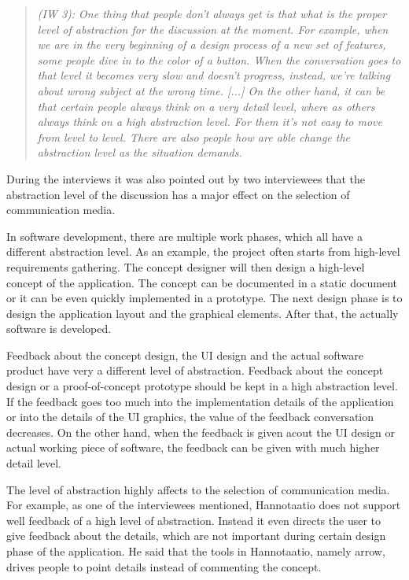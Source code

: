 \documentclass[english,12pt,a4paper,pdftex]{article}
\newcommand{\q}[2]{
\begin{quote}
\emph{(IW #1): #2}
\end{quote}}
\begin{document}
\q{3}{One thing that people don't always get is that what is the proper level of abstraction for the discussion at the moment. For example, when we are in the very beginning of a design process of a new set of features, some people dive in to the color of a button. When the conversation goes to that level it becomes very slow and doesn't progress, instead, we're talking about wrong subject at the wrong time. [...] On the other hand, it can be that certain people always think on a very detail level, where as others always think on a high abstraction level. For them it's not easy to move from level to level. There are also people how are able change the abstraction level as the situation demands.}

During the interviews it was also pointed out by two interviewees that the abstraction level of the discussion has a major effect on the selection of communication media.

In software development, there are multiple work phases, which all have a different abstraction level. As an example, the project often starts from high-level requirements gathering. The concept designer will then design a high-level concept of the application. The concept can be documented in a static document or it can be even quickly implemented in a prototype. The next design phase is to design the application layout and the graphical elements. After that, the actually software is developed.

Feedback about the concept design, the \ac{UI} design and the actual software product have very a different level of abstraction. Feedback about the concept design or a proof-of-concept prototype should be kept in a high abstraction level. If the feedback goes too much into the implementation details of the application or into the details of the \ac{UI} graphics, the value of the feedback conversation decreases. On the other hand, when the feedback is given acout the \ac{UI} design or actual working piece of software, the feedback can be given with much higher detail level.

The level of abstraction highly affects to the selection of communication media. For example, as one of the interviewees mentioned, Hannotaatio does not support well feedback of a high level of abstraction. Instead it even directs the user to give feedback about the details, which are not important during certain design phase of the application. He said that the tools in Hannotaatio, namely arrow, drives people to point details instead of commenting the concept.
\end{document}

